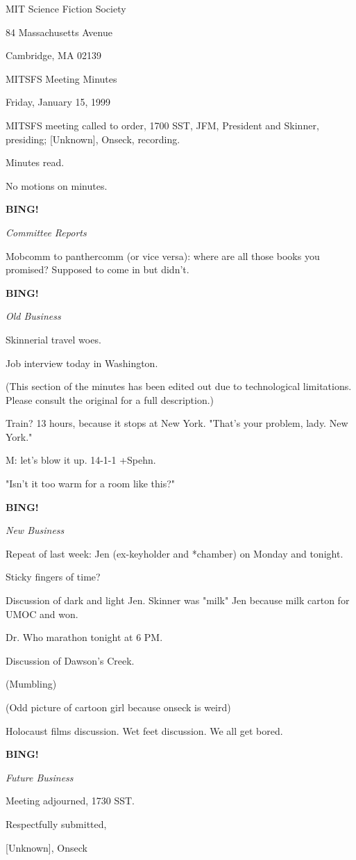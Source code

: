 \documentclass[12pt]{article}
\newcommand{\bing}{{\bf BING!} }
\newcommand{\goto}[1]{\bing \vskip 12pt \centerline{{\em{#1}}}}
\begin{document}
\begin{center}

MIT Science Fiction Society 

84 Massachusetts Avenue

Cambridge, MA 02139

\vspace{12pt}

MITSFS Meeting Minutes 

Friday, January 15, 1999

\end{center}
 
\vspace{18pt}

\setlength{\parskip}{6pt}

\noindent
MITSFS meeting called to order, 1700 SST,
JFM, President and Skinner, presiding; [Unknown], Onseck, recording.

Minutes read.

No motions on minutes.

\goto{Committee Reports}

Mobcomm to panthercomm (or vice versa): where are all those books you promised? Supposed to come in but didn't.

\goto{Old Business}

Skinnerial travel woes.

Job interview today in Washington.

(This section of the minutes has been edited out due to technological limitations. Please consult the original for a full description.)

Train? 13 hours, because it stops at New York. "That's your problem, lady. New York."

M: let's blow it up. 14-1-1 +Spehn.

"Isn't it too warm for a room like this?"

\goto{New Business}

Repeat of last week: Jen (ex-keyholder and *chamber) on Monday and tonight.

Sticky fingers of time?

Discussion of dark and light Jen. Skinner was "milk" Jen because milk carton for UMOC and won.

Dr. Who marathon tonight at 6 PM.

Discussion of Dawson's Creek.

(Mumbling)

(Odd picture of cartoon girl because onseck is weird)

Holocaust films discussion. Wet feet discussion. We all get bored.

\goto{Future Business}

\vspace{12pt}

\noindent
Meeting adjourned, 1730 SST.

\vspace{18pt}

\centerline{Respectfully submitted,}
\centerline{[Unknown], Onseck}
\end{document}
